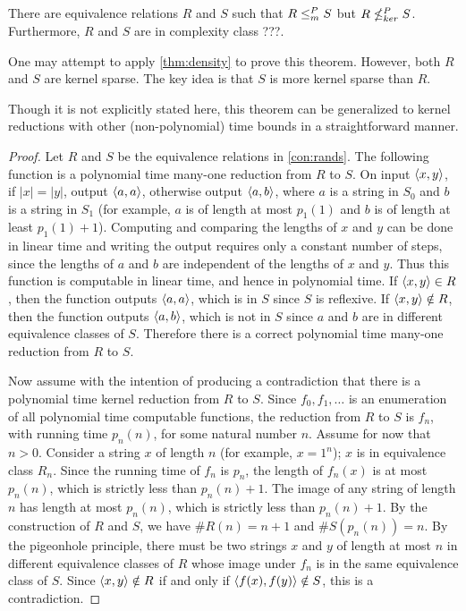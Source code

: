 \begin{theorem}
  There are equivalence relations $R$ and $S$ such that $R \leq^{P}_{m} S$ but $R \nleq^{P}_{ker} S$.
  Furthermore, $R$ and $S$ are in complexity class ???.
\end{theorem}

One may attempt to apply \autoref{thm:density} to prove this theorem.
However, both $R$ and $S$ are kernel sparse.
The key idea is that $S$ is more kernel sparse than $R$.

Though it is not explicitly stated here, this theorem can be generalized to kernel reductions with other (non-polynomial) time bounds in a straightforward manner.

\begin{proof}
  Let $R$ and $S$ be the equivalence relations in \autoref{con:rands}.
  The following function is a polynomial time many-one reduction from $R$ to $S$.
  On input $\left\langle x,y\right\rangle$, if $|x| = |y|$, output $\left\langle a,a\right\rangle$, otherwise output $\left\langle a,b\right\rangle$, where $a$ is a string in $S_0$ and $b$ is a string in $S_1$ (for example, $a$ is of length at most $p_1(1)$ and $b$ is of length at least $p_1(1) + 1$).
  Computing and comparing the lengths of $x$ and $y$ can be done in linear time and writing the output requires only a constant number of steps, since the lengths of $a$ and $b$ are independent of the lengths of $x$ and $y$.
  Thus this function is computable in linear time, and hence in polynomial time.
  If $\left\langle x,y\right\rangle \in R$, then the function outputs $\left\langle a,a\right\rangle$, which is in $S$ since $S$ is reflexive.
  If $\left\langle x,y\right\rangle \notin R$, then the function outputs $\left\langle a,b\right\rangle$, which is not in $S$ since $a$ and $b$ are in different equivalence classes of $S$.
  Therefore there is a correct polynomial time many-one reduction from $R$ to $S$.

  Now assume with the intention of producing a contradiction that there is a polynomial time kernel reduction from $R$ to $S$.
  Since $f_0, f_1, \dotsc$ is an enumeration of all polynomial time computable functions, the reduction from $R$ to $S$ is $f_n$, with running time $p_n(n)$, for some natural number $n$.
  Assume for now that $n > 0$.
  Consider a string $x$ of length $n$ (for example, $x = 1^n$); $x$ is in equivalence class $R_n$.
  Since the running time of $f_n$ is $p_n$, the length of $f_n(x)$ is at most $p_n(n)$, which is strictly less than $p_n(n) + 1$.
  The image of any string of length $n$ has length at most $p_n(n)$, which is strictly less than $p_n(n) + 1$.
  By the construction of $R$ and $S$, we have $\#R(n) = n + 1$ and $\#S(p_n(n)) = n$.
  By the pigeonhole principle, there must be two strings $x$ and $y$ of length at most $n$ in different equivalence classes of $R$ whose image under $f_n$ is in the same equivalence class of $S$.
  Since $\left\langle x,y\right\rangle \notin R$ if and only if $\left\langle f(x),f(y)\right\rangle \notin S$, this is a contradiction.


\end{proof}
